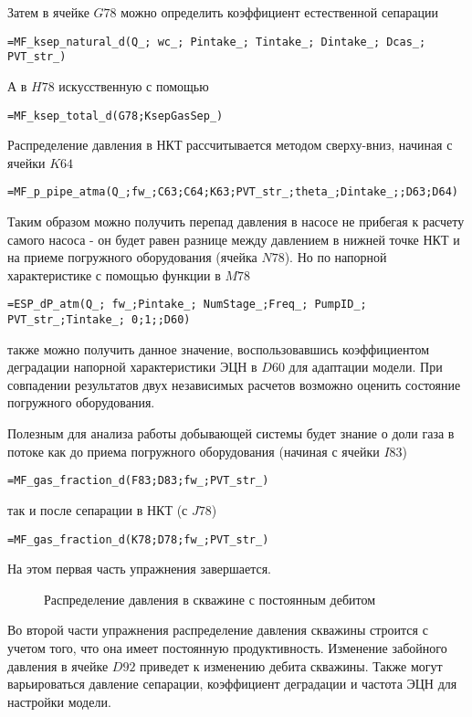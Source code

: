 Затем в ячейке $G78$ можно определить коэффициент естественной сепарации

{ \small  \texttt{=MF\_ksep\_natural\_d(Q\_; wc\_; Pintake\_; Tintake\_; Dintake\_; Dcas\_; PVT\_str\_)
}}

А в $H78$ искусственную с помощью 

{ \small  \texttt{=MF\_ksep\_total\_d(G78;KsepGasSep\_)
}}

Распределение давления в НКТ рассчитывается методом сверху-вниз, начиная с ячейки $K64$

{ \small  \texttt{=MF\_p\_pipe\_atma(Q\_;fw\_;C63;C64;K63;PVT\_str\_;theta\_;Dintake\_;;D63;D64)
}}

Таким образом можно получить перепад давления в насосе не прибегая к расчету самого насоса - он будет равен разнице между давлением в нижней точке НКТ и на приеме погружного оборудования (ячейка $N78$). Но по напорной характеристике с помощью функции в $M78$

{ \small  \texttt{=ESP\_dP\_atm(Q\_; fw\_;Pintake\_; NumStage\_;Freq\_; PumpID\_; PVT\_str\_;Tintake\_; 0;1;;D60)
}}

также можно получить данное значение, воспользовавшись коэффициентом деградации напорной характеристики ЭЦН в $D60$ для адаптации модели. При совпадении результатов двух независимых расчетов возможно оценить состояние погружного оборудования.

Полезным для анализа работы добывающей системы будет знание о доли газа в потоке как до приема погружного оборудования (начиная с ячейки $I83$)

{ \small  \texttt{=MF\_gas\_fraction\_d(F83;D83;fw\_;PVT\_str\_)
}}

так и после сепарации в НКТ (с $J78$)

{ \small  \texttt{=MF\_gas\_fraction\_d(K78;D78;fw\_;PVT\_str\_)
}}

На этом первая часть упражнения завершается.

\begin{figure}[h!]
	\center{\texttt{[image: Ex100\_2]}}
	\caption{Распределение давления в скважине с постоянным дебитом}
	\label{ris:Ex100_2}
\end{figure}

Во второй части упражнения распределение давления скважины строится с учетом того, что она имеет постоянную продуктивность. Изменение забойного давления в ячейке $D92$ приведет к изменению дебита скважины. Также могут варьироваться давление сепарации, коэффициент деградации и частота ЭЦН для настройки модели.

